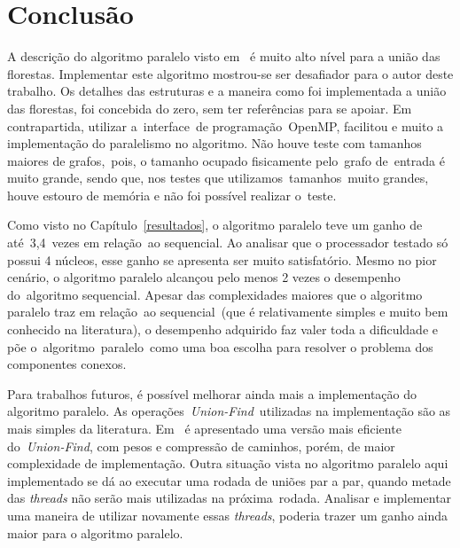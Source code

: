 \documentclass[12pt]{article}
\begin{document}
\section{Conclusão}
\label{conclusao}

A descrição do algoritmo paralelo visto em~\cite{Grama:2003} é muito alto nível para a união das florestas. Implementar este algoritmo mostrou-se ser desafiador para o autor deste trabalho. Os detalhes das estruturas e a maneira como foi implementada a união das florestas, foi concebida do zero, sem ter referências para se apoiar. Em contrapartida, utilizar a interface de programação OpenMP, facilitou e muito a implementação do paralelismo no algoritmo. Não houve teste com tamanhos maiores de grafos, pois, o tamanho ocupado fisicamente pelo grafo de entrada é muito grande, sendo que, nos testes que utilizamos tamanhos muito grandes, houve estouro de memória e não foi possível realizar o teste.

Como visto no Capítulo~\ref{resultados}, o algoritmo paralelo teve um ganho de até 3,4 vezes em relação ao sequencial. Ao analisar que o processador testado só possui 4 núcleos, esse ganho se apresenta ser muito satisfatório. Mesmo no pior cenário, o algoritmo paralelo alcançou pelo menos 2 vezes o desempenho do algoritmo sequencial. Apesar das complexidades maiores que o algoritmo paralelo traz em relação ao sequencial (que é relativamente simples e muito bem conhecido na literatura), o desempenho adquirido faz valer toda a dificuldade e põe o algoritmo paralelo como uma boa escolha para resolver o problema dos componentes conexos.

Para trabalhos futuros, é possível melhorar ainda mais a implementação do algoritmo paralelo. As operações \emph{Union-Find} utilizadas na implementação são as mais simples da literatura. Em~\cite{Sedgewick:2011} é apresentado uma versão mais eficiente do \emph{Union-Find}, com pesos e compressão de caminhos, porém, de maior complexidade de implementação. Outra situação vista no algoritmo paralelo aqui implementado se dá ao executar uma rodada de uniões par a par, quando metade das \emph{threads} não serão mais utilizadas na próxima rodada. Analisar e implementar uma maneira de utilizar novamente essas \emph{threads}, poderia trazer um ganho ainda maior para o algoritmo paralelo.



\end{document}
